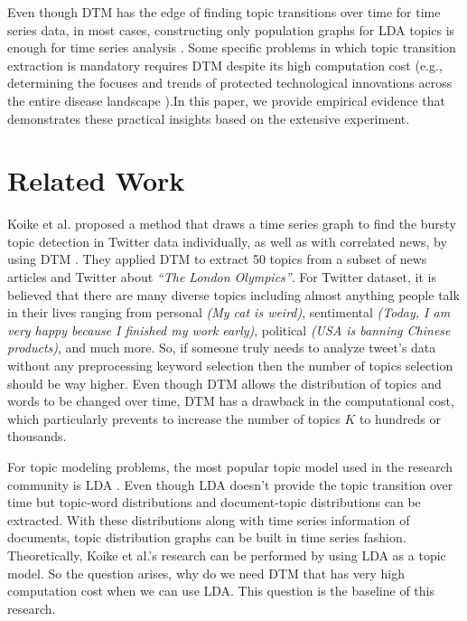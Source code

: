 \documentclass[a4paper]{report}
\begin{document}
Even though DTM has the edge of finding topic transitions over time for time series data, in most cases, constructing only population graphs for LDA topics is enough for time series analysis \cite{aubert2013clustering,pan2011event,shirota2014extraction}.
Some specific problems in which topic transition extraction is mandatory requires DTM despite its high computation cost (e.g., determining the focuses and trends of protected technological innovations across the entire disease landscape \cite{huang2019technological}).In this paper, we provide empirical evidence that demonstrates these practical insights based on the extensive experiment.


\chapter{Related Work}
Koike et al. \cite{koike2013time} proposed a method that draws a time series graph to find the bursty topic detection in Twitter data individually, as well as with correlated news, by using DTM \cite{blei2006dynamic}. They applied DTM to extract 50 topics from a subset of news articles and Twitter about \textit{``The London Olympics''}. For Twitter dataset, it is believed that there are many diverse topics including almost anything people talk in their lives ranging from personal \emph{(My cat is weird)}, sentimental \emph{(Today, I am very happy because I finished my work early)}, political \emph{(USA is banning Chinese products)}, and much more. So, if someone truly needs to analyze tweet's data without any preprocessing keyword selection then the number of topics selection should be way higher. Even though DTM allows the distribution of topics and words to be changed over time, DTM has a drawback in the computational cost, which particularly prevents to increase the number of topics $K$ to hundreds or thousands. 

For topic modeling problems, the most popular topic model used in the research community is LDA \cite{blei2003latent}. Even though LDA doesn't provide the topic transition over time but topic-word distributions and document-topic distributions can be extracted. With these distributions along with time series information of documents, topic distribution graphs can be built in time series fashion. Theoretically, Koike et al.'s research can be performed by using LDA as a topic model. So the question arises, why do we need DTM that has very high computation cost when we can use LDA. This question is the baseline of this research.
\end{document}
